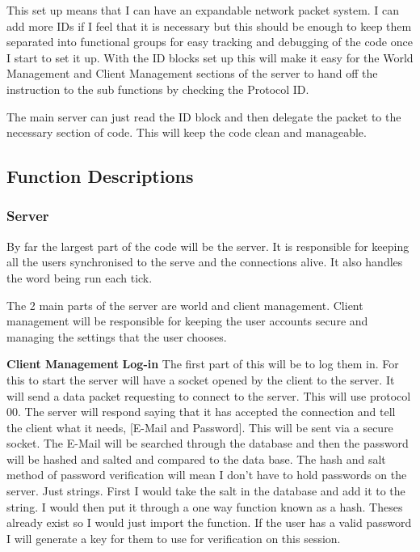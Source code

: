 \documentclass[12pt]{article}
\begin{document}
This set up means that I can have an expandable network packet system. I can add more IDs if I feel that it is necessary but this should be enough to keep them separated into functional groups for easy tracking and debugging of the code once I start to set it up. 
With the ID blocks set up this will make it easy for the World Management and Client Management sections of the server to hand off the instruction to the sub functions by checking the Protocol ID.

The main server can just read the ID block and then delegate the packet to the necessary section of code. This will keep the code clean and manageable.


\subsection{Function Descriptions}
\subsubsection{Server}
By far the largest part of the code will be the server. It is responsible for keeping all the users synchronised to the serve and the connections alive. It also handles the word being run each tick.

The 2 main parts of the server are world and client management. Client management will be responsible for keeping the user accounts secure and managing the settings that the user chooses.

\textbf{Client Management}\newline
\textbf{Log-in}\newline
The first part of this will be to log them in. For this to start the server will have a socket opened by the client to the server. It will send a data packet requesting to connect to the server. This will use protocol 00. The server will respond saying that it has accepted the connection and tell the client what it needs, [E-Mail and Password]. This will be sent via a secure socket. The E-Mail will be searched through the database and then the password will be hashed and salted and compared to the data base. The hash and salt method of password verification will mean I don't have to hold passwords on the server. Just strings. First I would take the salt in the database and add it to the string. I would then put it through a one way function known as a hash. Theses already exist so I would just import the function. If the user has a valid password I will generate a key for them to use for verification on this session.
\end{document}
